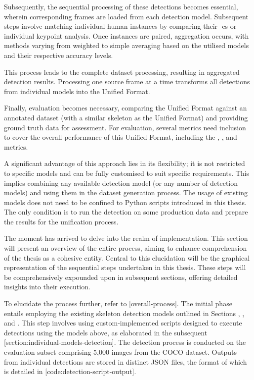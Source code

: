 Subsequently, the sequential processing of these detections becomes essential, wherein corresponding frames are loaded from each detection model. Subsequent steps involve matching individual human instances by comparing their \pojem{\BBOX}-es or individual keypoint analysis. Once instances are paired, aggregation occurs, with methods varying from weighted to simple averaging based on the utilised models and their respective accuracy levels.

This process leads to the complete dataset processing, resulting in aggregated detection results. Processing one source frame at a time transforms all detections from individual models into the Unified Format.

Finally, evaluation becomes necessary, comparing the Unified Format against an annotated dataset (with a similar skeleton as the Unified Format) and providing ground truth data for assessment. For evaluation, several metrics need inclusion to cover the overall performance of this Unified Format, including the \pojem{\APE}, \pojem{\MSE}, and \pojem{\OKS} metrics.

A significant advantage of this approach lies in its flexibility; it is not restricted to specific models and can be fully customised to suit specific requirements. This implies combining any available detection model (or any number of detection models) and using them in the dataset generation process. The usage of existing models does not need to be confined to Python scripts introduced in this thesis. The only condition is to run the detection on some production data and prepare the results for the unification process.


The moment has arrived to delve into the realm of implementation. This section will present an overview of the entire process, aiming to enhance comprehension of the thesis as a cohesive entity. Central to this elucidation will be the graphical representation of the sequential steps undertaken in this thesis. These steps will be comprehensively expounded upon in subsequent sections, offering detailed insights into their execution.

To elucidate the process further, refer to [overall-process]. The initial phase entails employing the existing skeleton detection models outlined in Sections , , and . This step involves using custom-implemented scripts designed to exe\-cute detections using the models above, as elaborated in the subsequent [section:individual-models-detection]. The detection process is conducted on the evaluation subset comprising 5,000 images from the COCO dataset. Outputs from individual detections are stored in distinct JSON files, the format of which is detailed in [code:detection-script-output].

